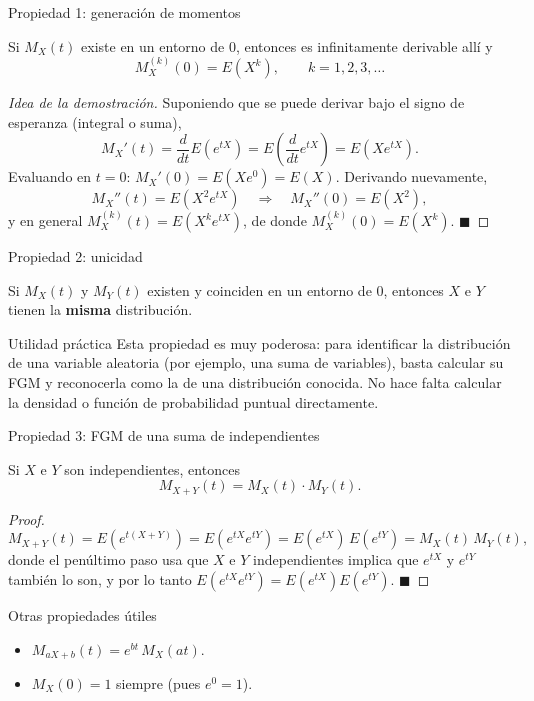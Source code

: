 \documentclass[aspectratio=169,11pt]{beamer}
\begin{document}
\begin{frame}{Propiedad 1: generación de momentos}
\begin{theorem}
Si $M_X(t)$ existe en un entorno de $0$, entonces es infinitamente derivable allí y
\[
M_X^{(k)}(0) = E(X^k), \qquad k=1,2,3,\dots
\]
\end{theorem}

\begin{proof}[Idea de la demostración]
Suponiendo que se puede derivar bajo el signo de esperanza (integral o suma),
\[
M_X'(t) = \frac{d}{dt} E(e^{tX}) = E\left(\frac{d}{dt}e^{tX}\right) = E(X e^{tX}).
\]
Evaluando en $t=0$: $M_X'(0) = E(X e^{0}) = E(X)$. Derivando nuevamente,
\[
M_X''(t) = E(X^2 e^{tX}) \quad \Rightarrow \quad M_X''(0) = E(X^2),
\]
y en general $M_X^{(k)}(t) = E(X^k e^{tX})$, de donde $M_X^{(k)}(0) = E(X^k)$. $\blacksquare$
\end{proof}
\end{frame}

\begin{frame}{Propiedad 2: unicidad}
\begin{theorem}[Unicidad]
Si $M_X(t)$ y $M_Y(t)$ existen y coinciden en un entorno de $0$, entonces $X$ e $Y$ tienen la \textbf{misma} distribución.
\end{theorem}

\begin{alertblock}{Utilidad práctica}
Esta propiedad es muy poderosa: para identificar la distribución de una variable aleatoria (por ejemplo, una suma de variables), basta calcular su FGM y reconocerla como la de una distribución conocida. No hace falta calcular la densidad o función de probabilidad puntual directamente.
\end{alertblock}
\end{frame}

\begin{frame}{Propiedad 3: FGM de una suma de independientes}
\begin{theorem}
Si $X$ e $Y$ son independientes, entonces
\[
M_{X+Y}(t) = M_X(t)\cdot M_Y(t).
\]
\end{theorem}

\begin{proof}
\[
M_{X+Y}(t) = E\left(e^{t(X+Y)}\right) = E\left(e^{tX}e^{tY}\right) = E(e^{tX})\,E(e^{tY}) = M_X(t)\,M_Y(t),
\]
donde el penúltimo paso usa que $X$ e $Y$ independientes implica que $e^{tX}$ y $e^{tY}$ también lo son, y por lo tanto $E(e^{tX}e^{tY}) = E(e^{tX})E(e^{tY})$. $\blacksquare$
\end{proof}

\begin{block}{Otras propiedades útiles}
\begin{itemize}
\item $M_{aX+b}(t) = e^{bt}\, M_X(at)$.
\item $M_X(0) = 1$ siempre (pues $e^{0}=1$).
\end{itemize}
\end{block}
\end{frame}
\end{document}
